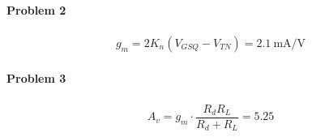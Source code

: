 \documentclass{article}
\begin{document}
\paragraph{Problem 2}

\begin{equation*}
  \begin{aligned}
    g_m = 2 K_n \left( V_{GSQ} - V_{TN}  \right) = 2.1 \  \mathrm{mA/V}
  \end{aligned}
\end{equation*}

\paragraph{Problem 3}

\begin{equation*}
  \begin{aligned}
    A_v = g_m \cdot \dfrac{R_d R_L}{R_d + R_L} = 5.25 
  \end{aligned}
\end{equation*}
\end{document}
